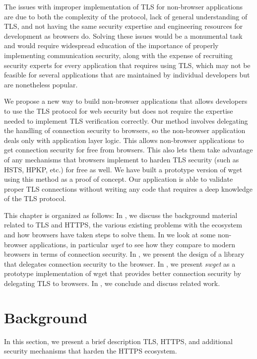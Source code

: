 The issues with improper implementation of TLS for non-browser applications are
due to both the complexity of the protocol, lack of general understanding of
TLS, and not having the same security expertise and engineering resources for
development as browsers do. Solving these issues would be a monumental task and
would require widespread education of the importance of properly implementing
communication security, along with the expense of recruiting security experts
for every application that requires using TLS, which may not be feasible for
several applications that are maintained by individual developers but are
nonetheless popular.

We propose a new way to build non-browser applications that allows developers
to use the TLS protocol for web security but does not require the expertise
needed to implement TLS verification correctly. Our method involves delegating
the handling of connection security to browsers, so the non-browser application
deals only with application layer logic. This allows non-browser applications
to get connection security for free from browsers. This also lets them take
advantage of any mechanisms that browsers implement to harden TLS security
(such as HSTS, HPKP, etc.) for free as well. We have built a prototype version
of wget using this method as a proof of concept. Our application is able to
validate proper TLS connections without writing any code that requires a deep
knowledge of the TLS protocol.

This chapter is organized as follows: In , we
discuss the background material related to TLS and HTTPS, the various existing
problems with the ecosystem and how browsers have taken steps to solve them. In
 we look at some non-browser applications, in
particular \emph{wget} to see how they compare to modern browsers in terms of
connection security. In , we present the design of a
library that delegates connection security to the browser. In
, we present \emph{swget} as a prototype implementation
of wget that provides better connection security by delegating TLS to browsers.
In , we conclude and discuss related work.


\section{Background}
\label{sec:background-saber}

In this section, we present a brief description TLS, HTTPS, and additional security
mechanisms that harden the HTTPS ecosystem.

